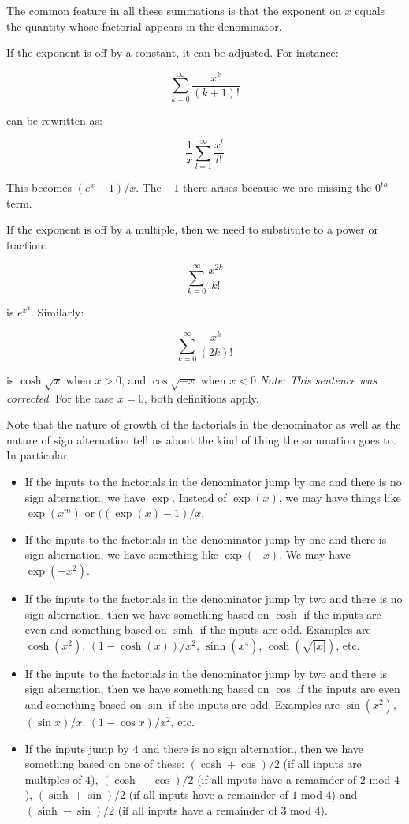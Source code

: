 \documentclass{amsart}
\begin{document}
The common feature in all these summations is that the exponent on $x$
equals the quantity whose factorial appears in the denominator.

If the exponent is off by a constant, it can be adjusted. For instance:

$$\sum_{k=0}^\infty \frac{x^k}{(k + 1)!}$$

can be rewritten as:

$$\frac{1}{x} \sum_{l=1}^\infty \frac{x^l}{l!}$$

This becomes $(e^x - 1)/x$. The $-1$ there arises because we are
missing the $0^{th}$ term.

If the exponent is off by a multiple, then we need to substitute to a
power or fraction:

$$\sum_{k=0}^\infty \frac{x^{2k}}{k!}$$

is $e^{x^2}$. Similarly:

$$\sum_{k=0}^\infty \frac{x^k}{(2k)!}$$

is $\cosh \sqrt{x}$ when $x > 0$, and $\cos \sqrt{-x}$ when $x < 0$
{\em Note: This sentence was corrected}. For the case $x = 0$, both
definitions apply.

Note that the nature of growth of the factorials in the denominator as
well as the nature of sign alternation tell us about the kind of thing
the summation goes to. In particular:

\begin{itemize}
\item If the inputs to the factorials in the denominator jump by one
  and there is no sign alternation, we have $\exp$. Instead of
  $\exp(x)$, we may have things like $\exp(x^m)$ or $((\exp(x) - 1)/x$.
\item If the inputs to the factorials in the denominator jump by one and
  there is sign alternation, we have something like $\exp(-x)$. We may
  have $\exp(-x^2)$.
\item If the inputs to the factorials in the denominator jump by two
  and there is no sign alternation, then we have something based on
  $\cosh$ if the inputs are even and something based on $\sinh$ if the
  inputs are odd. Examples are $\cosh(x^2)$, $(1 - \cosh(x))/x^2$,
  $\sinh(x^4)$, $\cosh(\sqrt{|x|})$, etc.
\item If the inputs to the factorials in the denominator jump by two
  and there is sign alternation, then we have something based on
  $\cos$ if the inputs are even and something based on $\sin$ if the
  inputs are odd. Examples are $\sin(x^2)$, $(\sin x)/x$, $(1 - \cos
  x)/x^2$, etc.
\item If the inputs jump by $4$ and there is no sign alternation, then
  we have something based on one of these: $(\cosh + \cos)/2$ (if all
  inputs are multiples of $4$), $(\cosh - \cos)/2$ (if all inputs have
  a remainder of $2$ mod $4$), $(\sinh + \sin)/2$ (if all inputs have
  a remainder of $1$ mod $4$) and $(\sinh - \sin)/2$ (if all inputs
  have a remainder of $3$ mod $4$).
\end{itemize}
\end{document}
